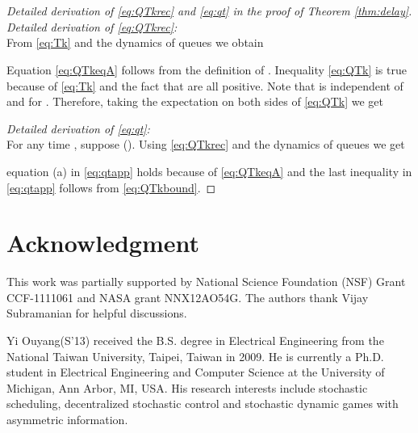 \documentclass[onecolumn,draftcls]{IEEEtran}
\begin{document}
\section{}
\label{app:thm:delay}
\begin{proof}[Detailed derivation of \eqref{eq:QTkrec} and \eqref{eq:qt}  in the proof of Theorem \ref{thm:delay}]
\\
\textit{Detailed derivation of \eqref{eq:QTkrec}:}
\\
From \eqref{eq:Tk} and the dynamics of queues we obtain

Equation \eqref{eq:QTkeqA} follows from the definition of . 
Inequality \eqref{eq:QTk} is true because of \eqref{eq:Tk} and the fact that  are all positive.
Note that  is independent of  and  for . 
Therefore, taking the expectation on both sides of \eqref{eq:QTk} we get


\textit{Detailed derivation of \eqref{eq:qt}:}
\\
For any time , suppose  (). Using \eqref{eq:QTkrec} and the dynamics of queues we get

equation (a) in \eqref{eq:qtapp} holds because of \eqref{eq:QTkeqA} and the last inequality in \eqref{eq:qtapp} follows from \eqref{eq:QTkbound}.


\end{proof}



\section*{Acknowledgment}
This work was partially supported by National Science Foundation (NSF) Grant CCF-1111061 and NASA grant NNX12AO54G.
The authors thank Vijay Subramanian for helpful discussions.


\ifCLASSOPTIONcaptionsoff
  \newpage
\fi













\begin{IEEEbiographynophoto}{Yi Ouyang}(S'13)
received the B.S. degree in Electrical Engineering from the National Taiwan University, Taipei, Taiwan in 2009.
He is currently a Ph.D. student in Electrical Engineering and Computer Science at the University of Michigan, Ann Arbor, MI, USA.
His research interests include stochastic scheduling, decentralized stochastic control and stochastic dynamic games with asymmetric information.

\end{IEEEbiographynophoto}
\end{document}
